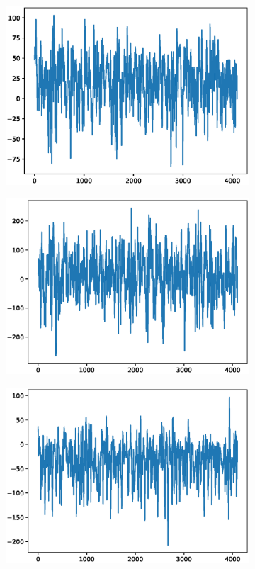 \documentclass[12pt]{article}
\begin{document}
\begin{figure}
\begin{subfigure}{.25\textwidth}
  \centering
  \includegraphics[width=.8\linewidth]{figures/signals/D/F015.eps}
\end{subfigure}%
\begin{subfigure}{.25\textwidth}
  \centering
  \includegraphics[width=.8\linewidth]{figures/signals/D/F024.eps}
\end{subfigure}
\begin{subfigure}{.25\textwidth}
  \centering
  \includegraphics[width=.8\linewidth]{figures/signals/D/F028.eps}

\end{subfigure}
\end{figure}
\end{document}
